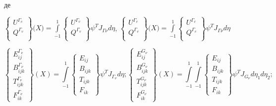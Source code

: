 \noindent де

$\begin{Bmatrix}
U^{\Gamma_{v}} \\
Q^{\Gamma_{v}} \\
\end{Bmatrix}{(X{) = {\int\limits_{- 1}^{1}\begin{Bmatrix}
U^{\Gamma_{v}} \\
Q^{\Gamma_{v}} \\
\end{Bmatrix}}}}\psi^{T}J_{\mathit{\Gamma\nu}}\mathit{d\eta}$,
$\begin{Bmatrix}
U^{\Gamma_{v}} \\
Q^{\Gamma_{v}} \\
\end{Bmatrix}{(X{) = {\int\limits_{- 1}^{1}\begin{Bmatrix}
U^{\Gamma_{v}} \\
Q^{\Gamma_{v}} \\
\end{Bmatrix}}}}\psi^{T}J_{\mathit{\Gamma\nu}}\mathit{d\eta}$

\begin{equation*}
    \left\{ \begin{array}{lr} E_{ij}^{\Gamma_\nu} \\ B_{ijk}^{\Gamma_\nu} \\ T_{ijk}^{\Gamma_\nu} \\ F_{ik}^{\Gamma_\nu} \end{array} \right \} (X) =
    \int \limits_{-1}^1 
        \left\{ \begin{array}{lr} E_{ij} \\ B_{ijk} \\ T_{ijk} \\ F_{ik} \end{array} \right \} \psi^T J_{\Gamma_\nu} d \eta;
    \left\{ \begin{array}{lr} E_{ij}^{G_\nu} \\ B_{ijk}^{G_\nu} \\ T_{ijk}^{G_\nu} \\ F_{ik}^{G_\nu} \end{array} \right \} (X) =
    \int \limits_{-1}^1 \int \limits_{-1}^1 
        \left\{ \begin{array}{lr} E_{ij} \\ B_{ijk} \\ T_{ijk} \\ F_{ik} \end{array} \right \} \psi^T J_{G_\nu} d \eta_1 d \eta_2;
\end{equation*}

